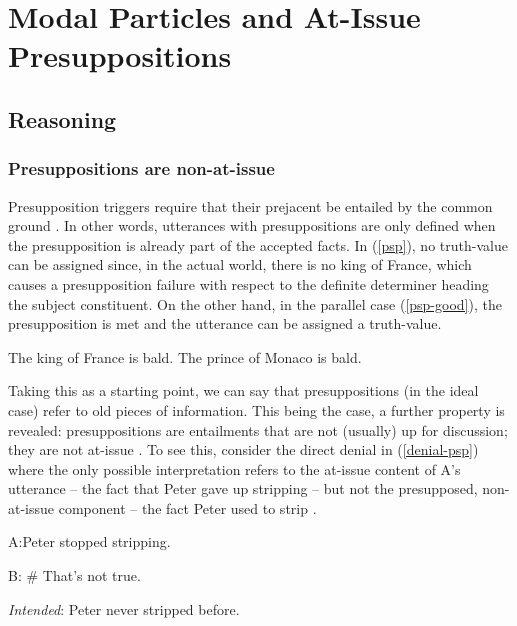 \chapter{Modal Particles and At-Issue Presuppositions}

\section{Reasoning}

\subsection{Presuppositions are non-at-issue}

Presupposition triggers require that their prejacent be entailed by the common ground \parencite{stalnaker2002common}. In other words,
utterances with presuppositions are only defined when the presupposition is already part of the
accepted facts. In (\ref{psp}), no truth-value can be assigned since, in the actual world, there is no king of
France, which causes a presupposition failure with respect to the definite determiner heading the
subject constituent. On the other hand, in the parallel case (\ref{psp-good}), the presupposition is
met and the utterance can be assigned a truth-value.

\begin{exe}
    \ex \begin{xlist}
        \ex \label{psp}The king of France is bald.
        \ex \label{psp-good} The prince of Monaco is bald.
    \end{xlist}
\end{exe}

Taking this as a starting point, we can say that presuppositions (in the ideal case) refer to old
pieces of information. This being the case, a further property is revealed: presuppositions are
entailments that are not (usually) up for discussion; they are not at-issue
\parencite{aravind2017factivity}. To see this, consider the direct denial in (\ref{denial-psp})
where the only possible interpretation refers to the at-issue content of A's utterance -- the fact
that Peter gave up stripping -- but not the presupposed, non-at-issue component -- the fact Peter
used to strip \parencite[cf.][]{tonhauser2012diagnosing}.

\begin{exe}
    \ex\label{denial-psp}A:\@ Peter stopped stripping.

    B: \# That's not true.

    \textit{Intended}: Peter never stripped before.
\end{exe}

